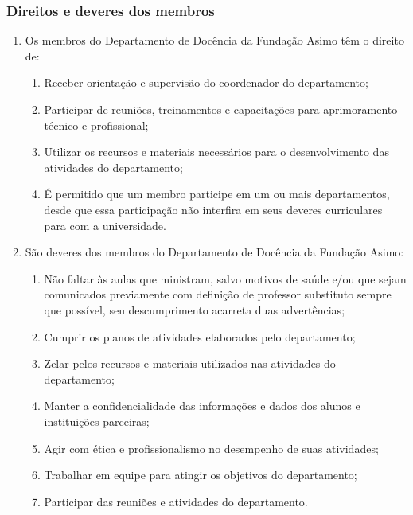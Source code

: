        \subsubsection{Direitos e deveres dos membros}
        \begin{enumerate}
            \item Os membros do Departamento de Docência da Fundação Asimo têm o direito de:
            \begin{enumerate}
                \item Receber orientação e supervisão do coordenador do departamento;
                \item Participar de reuniões, treinamentos e capacitações para aprimoramento técnico e profissional;
                \item Utilizar os recursos e materiais necessários para o desenvolvimento das atividades do departamento;
                \item É permitido que um membro participe em um ou mais departamentos, desde que essa participação não interfira em seus deveres curriculares para com a universidade.
            \end{enumerate}
            \item São deveres dos membros do Departamento de Docência da Fundação Asimo:
            \begin{enumerate}
                \item Não faltar às aulas que ministram, salvo motivos de saúde e/ou que sejam comunicados previamente com definição de professor substituto sempre que possível, seu descumprimento acarreta duas advertências; \label{adv2}
                \item Cumprir os planos de atividades elaborados pelo departamento;
                \item Zelar pelos recursos e materiais utilizados nas atividades do departamento;
                \item Manter a confidencialidade das informações e dados dos alunos e instituições parceiras;
                \item Agir com ética e profissionalismo no desempenho de suas atividades;
                \item Trabalhar em equipe para atingir os objetivos do departamento;
                \item Participar das reuniões e atividades do departamento.
            \end{enumerate}
        \end{enumerate}
